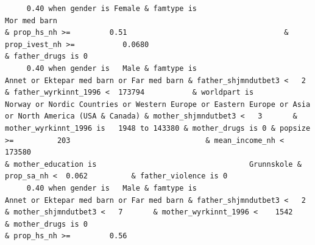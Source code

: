 \documentclass[
  letterpaper,
  DIV=11,
  numbers=noendperiod]{scrreprt}
\begin{document}
\begin{verbatim}
     0.40 when gender is Female & famtype is                                                     Mor med barn                                                                                                                                                                                                                                                                                                                                                                                                                               & prop_hs_nh >=         0.51                                    & prop_ivest_nh >=           0.0680                                                                                                                          & father_drugs is 0                                                                                           
     0.40 when gender is   Male & famtype is                        Annet or Ektepar med barn or Far med barn & father_shjmndutbet3 <   2       & father_wyrkinnt_1996 <  173794           & worldpart is                              Norway or Nordic Countries or Western Europe or Eastern Europe or Asia or North America (USA & Canada) & mother_shjmndutbet3 <   3       & mother_wyrkinnt_1996 is   1948 to 143380 & mother_drugs is 0 & popsize >=          203                               & mean_income_nh <  173580                                                                                                               & mother_education is                                   Grunnskole & prop_sa_nh <  0.062          & father_violence is 0                                                                                                               
     0.40 when gender is   Male & famtype is                        Annet or Ektepar med barn or Far med barn & father_shjmndutbet3 <   2                                                                                                                                                                                                     & mother_shjmndutbet3 <   7       & mother_wyrkinnt_1996 <    1542           & mother_drugs is 0                                                                                              & prop_hs_nh >=         0.56                                                                                                                                                                                                                                                                                                               

\end{verbatim}
\end{document}
